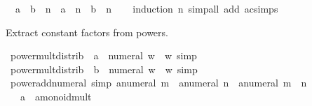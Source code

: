 \begin{isabellebody}
\ \ {\isachardoublequoteopen}{\isacharparenleft}{\kern0pt}a\ {\isacharasterisk}{\kern0pt}\ b{\isacharparenright}{\kern0pt}\ {\isacharcircum}{\kern0pt}\ n\ {\isacharequal}{\kern0pt}\ {\isacharparenleft}{\kern0pt}a\ {\isacharcircum}{\kern0pt}\ n{\isacharparenright}{\kern0pt}\ {\isacharasterisk}{\kern0pt}\ {\isacharparenleft}{\kern0pt}b\ {\isacharcircum}{\kern0pt}\ n{\isacharparenright}{\kern0pt}{\isachardoublequoteclose}\isanewline
%
\isadelimproof
\ \ %
\endisadelimproof
%
\isatagproof
{}\isamarkupfalse%
\ {\isacharparenleft}{\kern0pt}induction\ n{\isacharparenright}{\kern0pt}\ {\isacharparenleft}{\kern0pt}simp{\isacharunderscore}{\kern0pt}all\ add{\isacharcolon}{\kern0pt}\ ac{\isacharunderscore}{\kern0pt}simps{\isacharparenright}{\kern0pt}%
\endisatagproof
{\isafoldproof}%
%
\isadelimproof
\isanewline
%
\endisadelimproof
\isanewline
{}\isamarkupfalse%
%
\begin{isamarkuptext}%
Extract constant factors from powers.%
\end{isamarkuptext}\isamarkuptrue%
\isamarkupfalse%
\ power{\isacharunderscore}{\kern0pt}mult{\isacharunderscore}{\kern0pt}distrib\ {\isacharbrackleft}{\kern0pt}\ a\ {\isacharequal}{\kern0pt}\ {\isachardoublequoteopen}numeral\ w{\isachardoublequoteclose}\ \ w{\isacharcomma}{\kern0pt}\ simp{\isacharbrackright}{\kern0pt}\isanewline
{}\isamarkupfalse%
\ power{\isacharunderscore}{\kern0pt}mult{\isacharunderscore}{\kern0pt}distrib\ {\isacharbrackleft}{\kern0pt}\ b\ {\isacharequal}{\kern0pt}\ {\isachardoublequoteopen}numeral\ w{\isachardoublequoteclose}\ \ w{\isacharcomma}{\kern0pt}\ simp{\isacharbrackright}{\kern0pt}\isanewline
\isanewline
{}\isamarkupfalse%
\ power{\isacharunderscore}{\kern0pt}add{\isacharunderscore}{\kern0pt}numeral\ {\isacharbrackleft}{\kern0pt}simp{\isacharbrackright}{\kern0pt}{\isacharcolon}{\kern0pt}\ {\isachardoublequoteopen}a{\isacharcircum}{\kern0pt}numeral\ m\ {\isacharasterisk}{\kern0pt}\ a{\isacharcircum}{\kern0pt}numeral\ n\ {\isacharequal}{\kern0pt}\ a{\isacharcircum}{\kern0pt}numeral\ {\isacharparenleft}{\kern0pt}m\ {\isacharplus}{\kern0pt}\ n{\isacharparenright}{\kern0pt}{\isachardoublequoteclose}\isanewline
\ \ \ a\ {\isacharcolon}{\kern0pt}{\isacharcolon}{\kern0pt}\ {\isachardoublequoteopen}{\isacharprime}{\kern0pt}a{\isacharcolon}{\kern0pt}{\isacharcolon}{\kern0pt}monoid{\isacharunderscore}{\kern0pt}mult{\isachardoublequoteclose}\isanewline
%
\isadelimproof
\ \ %
\endisadelimproof

\end{isabellebody}
